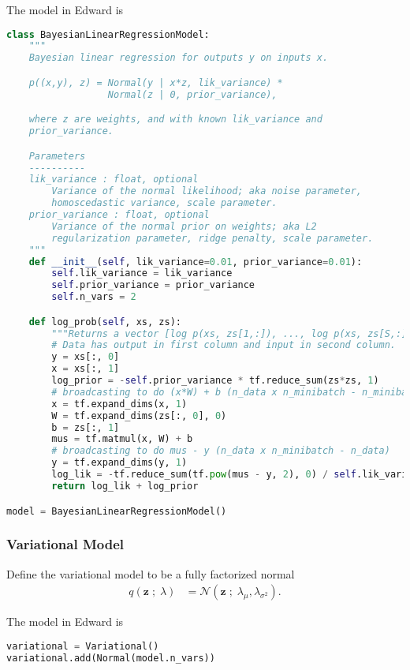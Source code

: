 The model in Edward is
\begin{lstlisting}[language=Python]
class BayesianLinearRegressionModel:
    """
    Bayesian linear regression for outputs y on inputs x.

    p((x,y), z) = Normal(y | x*z, lik_variance) *
                  Normal(z | 0, prior_variance),

    where z are weights, and with known lik_variance and
    prior_variance.

    Parameters
    ----------
    lik_variance : float, optional
        Variance of the normal likelihood; aka noise parameter,
        homoscedastic variance, scale parameter.
    prior_variance : float, optional
        Variance of the normal prior on weights; aka L2
        regularization parameter, ridge penalty, scale parameter.
    """
    def __init__(self, lik_variance=0.01, prior_variance=0.01):
        self.lik_variance = lik_variance
        self.prior_variance = prior_variance
        self.n_vars = 2

    def log_prob(self, xs, zs):
        """Returns a vector [log p(xs, zs[1,:]), ..., log p(xs, zs[S,:])]."""
        # Data has output in first column and input in second column.
        y = xs[:, 0]
        x = xs[:, 1]
        log_prior = -self.prior_variance * tf.reduce_sum(zs*zs, 1)
        # broadcasting to do (x*W) + b (n_data x n_minibatch - n_minibatch)
        x = tf.expand_dims(x, 1)
        W = tf.expand_dims(zs[:, 0], 0)
        b = zs[:, 1]
        mus = tf.matmul(x, W) + b
        # broadcasting to do mus - y (n_data x n_minibatch - n_data)
        y = tf.expand_dims(y, 1)
        log_lik = -tf.reduce_sum(tf.pow(mus - y, 2), 0) / self.lik_variance
        return log_lik + log_prior

model = BayesianLinearRegressionModel()
\end{lstlisting}


\subsubsection{Variational Model}
Define the variational model to be a fully factorized normal
\begin{align*}
  q(\mathbf{z} \;;\; \lambda)
  &=
  \mathcal{N}(\mathbf{z} \;;\; \lambda_\mu, \lambda_{\sigma^2}).
\end{align*}

The model in Edward is
\begin{lstlisting}[language=Python]
variational = Variational()
variational.add(Normal(model.n_vars))
\end{lstlisting}


